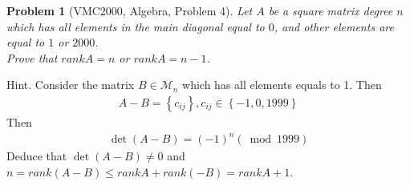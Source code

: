 \documentclass{article}
\newtheorem{problem}{Problem}
\begin{document}
\begin{problem}[VMC2000, Algebra, Problem 4]
	Let $A$ be a square matrix degree $n$ which has all elements in the main diagonal equal to $0$, and other elements are equal to $1$ or $2000$.\\
	Prove that $rank A = n$ or $rank A = n-1$.
\end{problem}
{\sf Hint.} Consider the matrix $B \in {\mathcal{M}_n}$ which has all elements equals to 1. Then 
\begin{align}
	A - B = \left\{ {{c_{ij}}} \right\},{c_{ij}} \in \left\{ { - 1,0,1999} \right\}
\end{align}
Then 
\begin{align}
	\det \left( {A - B} \right) = {\left( { - 1} \right)^n}\left( {\bmod 1999} \right)
\end{align}
Deduce that $\det \left( {A - B} \right) \ne 0$ and $n = rank\left( {A - B} \right) \le rankA + rank\left( { - B} \right) = rankA + 1$.
\end{document}
